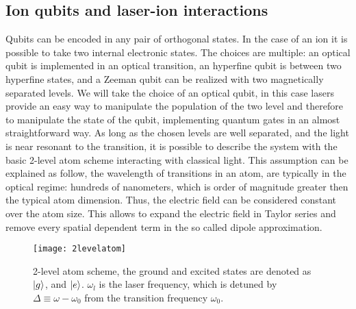 \subsection{Ion qubits and laser-ion interactions}
\label{laserioninteractions}
Qubits can be encoded in any pair of orthogonal states. In the case of an ion it is possible to take two internal electronic states. The choices are multiple: an optical qubit is implemented in an optical transition, an hyperfine qubit is between two hyperfine states, and a Zeeman qubit can be realized with two magnetically separated levels. We will take the choice of an optical qubit, in this case lasers provide an easy way to manipulate the population of the two level and therefore to manipulate the state of the qubit, implementing quantum gates in an almost straightforward way. As long as the chosen levels are well separated, and the light is near resonant to the transition, it is possible to describe the system with the basic 2-level atom scheme interacting with classical light. This assumption can be explained as follow, the wavelength of transitions in an atom, are typically in the optical regime: hundreds of nanometers, which is order of magnitude greater then the typical atom dimension. Thus, the electric field can be considered constant over the atom size. This allows to expand the electric field in Taylor series and remove every spatial dependent term in the so called dipole approximation.
\begin{figure}[H]
\centering
\texttt{[image: 2levelatom]}
\caption{2-level atom scheme, the ground and excited states are denoted as $\ket{g}$, and $\ket{e}$. $\omega_l$ is the laser frequency, which is detuned by $\Delta \equiv \omega - \omega_0$ from the transition frequency $\omega_0$.}
\label{2levelatom}
\end{figure}

